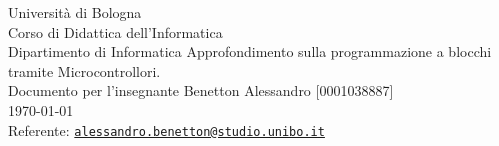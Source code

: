 \documentclass[../../docenti.tex]{subfiles}
\begin{document}
\begin{titlepage}
    \begin{center}
    {
        \LARGE{
            Università di Bologna \\ [1ex]
            Corso di Didattica dell'Informatica \\ Dipartimento di Informatica
        }
        \vfill
        {\huge
            Approfondimento sulla programmazione a blocchi tramite Microcontrollori.
        }
        \\ [1ex]
        {\large 
            Documento per l'insegnante
        }
        \vfill
        {\large   
            Benetton Alessandro [0001038887]\\[0.75ex]
            
        \vfill
        \today
        \\[4ex]
        Referente: \href{mailto:alessandro.benetton@studio.unibo.it}{\tt alessandro.benetton@studio.unibo.it}
        }
    }
    \end{center}
\end{titlepage}
\end{document}
